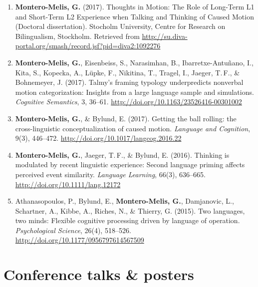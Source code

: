 \documentclass[margin, 11pt]{res} %
\begin{document}
\begin{resume}
\begin{enumerate}

	
	\item \textbf{Montero-Melis, G.} (2017). Thoughts in Motion: The Role of Long-Term L1 and Short-Term L2 Experience when Talking and Thinking of Caused Motion (Doctoral dissertation). Stocholm University, Centre for Research on Bilingualism, Stockholm. Retrieved from \url{http://su.diva-portal.org/smash/record.jsf?pid=diva2:1092276}

	\item \textbf{Montero-Melis, G.}, Eisenbeiss, S., Narasimhan, B., Ibarretxe-Antu\~{n}ano, I., Kita, S., Kopecka, A., L{\"u}pke, F., Nikitina, T., Tragel, I., Jaeger, T.\,F., \& Bohnemeyer, J. (2017). Talmy's framing typology underpredicts nonverbal motion categorization: Insights from a large language sample and simulations. \emph{Cognitive Semantics}, 3, 36--61. \url{http://doi.org/10.1163/23526416-00301002}

	\item \textbf{Montero-Melis, G.}, \& Bylund, E. (2017). Getting the ball rolling: the cross-linguistic conceptualization of caused motion. \emph{Language and Cognition}, 9(3), 446--472. \url{http://doi.org/10.1017/langcog.2016.22}

	\item \textbf{Montero-Melis, G.}, Jaeger, T.\,F., \& Bylund, E. (2016). Thinking is modulated by recent linguistic experience: Second language priming affects perceived event similarity. \emph{Language Learning}, 66(3), 636--665. \url{http://doi.org/10.1111/lang.12172}

	\item Athanasopoulos, P., Bylund, E., \textbf{Montero-Melis, G.}, Damjanovic, L., Schartner, A., Kibbe, A., Riches, N., \& Thierry, G. (2015). Two languages, two minds: Flexible cognitive processing driven by language of operation. \emph{Psychological Science}, 26(4), 518--526. \url{http://doi.org/10.1177/0956797614567509}

\end{enumerate}


\section{\sc Conference talks \& posters}
\begin{enumerate}


\end{enumerate}
\end{resume}
\end{document}
